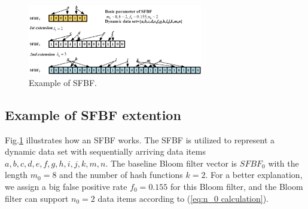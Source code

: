 \documentclass[10pt,journal,compsoc]{IEEEtran}
\begin{document}
\begin{figure}[!h]
\centering
\includegraphics[width=3.0in]{fig/SFBFexample}
\caption{Example of SFBF.}
\label{fig:Example of SFBF.}
\end{figure}
\subsection{Example of SFBF extention}
Fig.\ref{fig:Example of SFBF.} illustrates how an SFBF works. The SFBF is utilized to represent a dynamic data set with sequentially arriving data items  $a, b, c, d, e, f, g, h, i, j, k, m, n$. The baseline Bloom filter vector is $SFBF_0$ with  the length $m_0=8$ and the number of hash functions $k=2$. For a better explanation, we assign a big false positive rate $f_0=0.155$ for this Bloom filter, and the Bloom filter can support $n_0=2$ data items according to (\ref{eq:n_0 calculation}).
\end{document}
